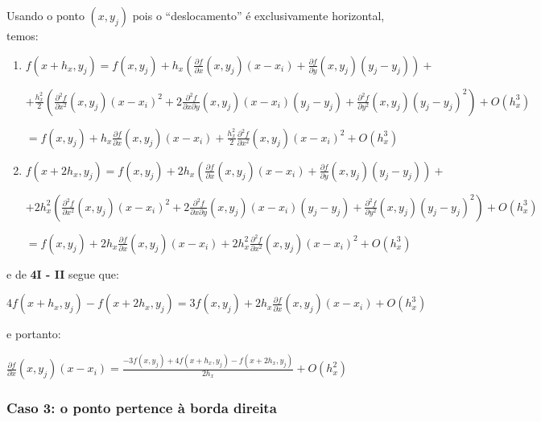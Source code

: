 \documentclass[11pt]{article}
\begin{document}
  \indent\indent Usando o ponto $(x, y_j)$ pois o ``deslocamento'' é exclusivamente horizontal, temos:

  \begin{enumerate}[label=\textbf{\Roman*)}]
    \item $f(x + h_x, y_j) = f(x, y_j) + h_x\left(\frac{\partial f}{\partial x}\left(x, y_j \right)\left(x - x_i \right) + \frac{\partial f}{\partial y}\left(x, y_j \right)\left(y_j - y_j \right) \right) +$

    $+ \frac{h_x^2}{2}\left(\frac{\partial^2 f}{\partial x^2}\left(x, y_j\right)\left(x - x_i\right)^2 + 2\frac{\partial^2 f}{\partial x \partial y}\left(x, y_j \right)\left(x - x_i\right)\left(y_j - y_j\right) +
    \frac{\partial^2 f}{\partial y^2}\left(x, y_j\right)\left(y_j - y_j\right)^2 \right) + O(h_x^3)$

    $= f(x, y_j) + h_x\frac{\partial f}{\partial x}\left(x, y_j \right)\left(x - x_i \right) + \frac{h_x^2}{2}\frac{\partial^2 f}{\partial x^2}\left(x, y_j\right)\left(x - x_i\right)^2 + O(h_x^3)$


    \item $f(x + 2h_x, y_j) = f(x, y_j) + 2h_x\left(\frac{\partial f}{\partial x}\left(x, y_j \right)\left(x - x_i \right) + \frac{\partial f}{\partial y}\left(x, y_j \right)\left(y_j - y_j \right) \right)+ $

    $+ 2h_x^2\left(\frac{\partial^2 f}{\partial x^2}\left(x, y_j\right)\left(x - x_i\right)^2 + 2\frac{\partial^2 f}{\partial x \partial y}\left(x, y_j \right)\left(x - x_i\right)\left(y_j - y_j\right) +
    \frac{\partial^2 f}{\partial y^2}\left(x, y_j\right)\left(y_j - y_j\right)^2 \right) + O(h_x^3)$

    $= f(x, y_j) + 2h_x\frac{\partial f}{\partial x}\left(x, y_j \right)\left(x - x_i \right) + 2h_x^2\frac{\partial^2 f}{\partial x^2}\left(x, y_j\right)\left(x - x_i\right)^2 + O(h_x^3)$
  \end{enumerate}

  e de \textbf{4I - II} segue que:

  $4f(x + h_x, y_j) - f(x + 2h_x, y_j) = 3f(x, y_j) + 2h_x\frac{\partial f}{\partial x}\left(x, y_j \right)\left(x - x_i \right) + O(h_x^3)$

  e portanto:

  $\frac{\partial f}{\partial x}\left(x, y_j \right)\left(x - x_i \right) = \frac{-3f(x, y_j) + 4f(x + h_x, y_j) - f(x + 2h_x, y_j)}{2h_x}  + O(h_x^2)$

  \subsubsection{Caso 3: o ponto pertence à borda direita}
\end{document}
